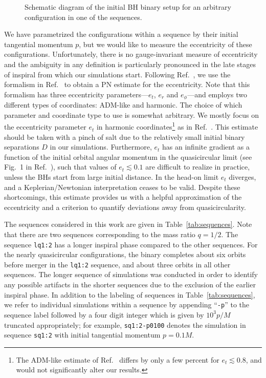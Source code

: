 \documentclass[floats,floatfix,showpacs,amssymb,physrev,twocolumn,superscriptaddress,reprint,
nofootinbib, longbibliography]{revtex4-2}
\begin{document}
\begin{figure}[t]
    \centering
    
    \caption{Schematic diagram of the initial BH binary setup for 
    an arbitrary configuration in one of the sequences.}
    \label{fig:bh-setup}
\end{figure}

We have parametrized the configurations within a sequence by their
initial tangential momentum $p$, but we would like to measure the
eccentricity of these configurations. Unfortunately, there is no
gauge-invariant measure of eccentricity~\cite{Loutrel:2018ydu} and the
ambiguity in any definition is particularly pronounced in the late
stages of inspiral from which our simulations start. Following
Ref.~\cite{Sperhake:2007gu}, we use the formalism in
Ref.~\cite{Memmesheimer:2004cv} to obtain a PN estimate for the
eccentricity. Note that this formalism has three eccentricity
parameters---$e_t$, $e_r$ and $e_\phi$---and employs two
different types of coordinates: ADM-like and harmonic. The choice of
which parameter and coordinate type to use is somewhat arbitrary.
We mostly focus on the eccentricity parameter $e_t$ in harmonic coordinates\footnote{
The ADM-like estimate of Ref.~\cite{Memmesheimer:2004cv} differs
by only a few percent for $e_t \lesssim 0.8$, and
would not significantly alter our results.} 
as in Ref.~\cite{Sperhake:2019wwo}. This estimate should be 
taken with a pinch of salt due to the relatively small initial binary 
separations $D$ in our simulations. Furthermore, $e_t$ has an infinite 
gradient as a function of the initial orbital angular momentum
in the quasicircular limit (see Fig.~1 in Ref.~\cite{Sperhake:2007gu}),
such that values of $e_t\lesssim0.1$ are difficult to realize in practice,
unless the BHs start from large initial distance.
In the head-on limit $e_t$ diverges, and a Keplerian/Newtonian
interpretation ceases to be valid. Despite these shortcomings, this 
estimate provides us with a helpful approximation of the eccentricity
and a criterion to quantify deviations away from quasicircularity.

The sequences considered in this work are given in
Table~\ref{tab:sequences}.  Note that there are two sequences
corresponding to the mass ratio $q=1/2$.  The sequence \texttt{lq1:2}
has a longer inspiral phase compared to the other sequences. For the
nearly quasicircular configurations, the binary completes about six
orbits before merger in the \texttt{lq1:2} sequence, and about three
orbits in all other sequences. The longer sequence of simulations was
conducted in order to identify any possible artifacts in the shorter
sequences due to the exclusion of the earlier inspiral phase. In
addition to the labeling of sequences in Table~\ref{tab:sequences},
we refer to individual simulations within a sequence by appending
``\texttt{-p}'' to the sequence label followed by a four digit integer
which is given by $10^3p/M$ truncated appropriately; for example,
\texttt{sq1:2-p0100} denotes the simulation in sequence
\texttt{sq1:2} with initial tangential momentum $p = 0.1M$.
\end{document}
